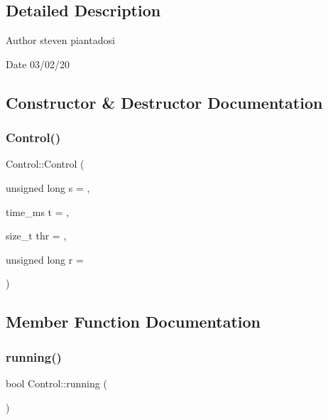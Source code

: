 \subsection{Detailed Description}
\begin{DoxyAuthor}{Author}
steven piantadosi 
\end{DoxyAuthor}
\begin{DoxyDate}{Date}
03/02/20 
\end{DoxyDate}


\subsection{Constructor \& Destructor Documentation}
\mbox{\label{struct_control_a4ff9d1cb18c06b5438f09ef6a8e7af80}} 
\subsubsection{\texorpdfstring{Control()}{Control()}}
{\footnotesize\ttfamily Control\+::\+Control (\begin{DoxyParamCaption}\item[{unsigned long}]{s = {},  }\item[{time\+\_\+ms}]{t = {},  }\item[{size\+\_\+t}]{thr = {},  }\item[{unsigned long}]{r = {} }\end{DoxyParamCaption})\hspace{0.3cm}{\ttfamily [inline]}}



\subsection{Member Function Documentation}
\mbox{\label{struct_control_a9217475a8ad619e7360524ae49c559a7}} 
\subsubsection{\texorpdfstring{running()}{running()}}
{\footnotesize\ttfamily bool Control\+::running (\begin{DoxyParamCaption}{ }\end{DoxyParamCaption})\hspace{0.3cm}{\ttfamily [inline]}}

